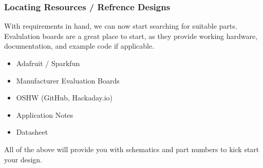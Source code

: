 \documentclass[aspectratio=169, t]{beamer}
\begin{document}
\begin{frame}
\frametitle{Locating Resources / Refrence Designs}
With requirements in hand, we can now start searching for suitable parts.\\
Evalulation boards are a great place to start, as they provide working hardware, documentation, and example code if applicable.\\[10pt]

\begin{itemize}
	\item Adafruit / Sparkfun
	\item Manufacturer Evaluation Boards
	\item OSHW (GitHub, Hackaday.io)
	\item Application Notes
	\item Datasheet
\end{itemize}
\vspace{10pt}
All of the above will provide you with schematics and part numbers to kick start your design.
\end{frame}
\end{document}
